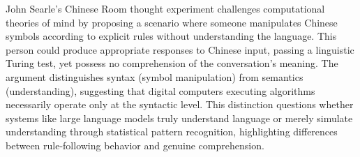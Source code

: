 John Searle's Chinese Room thought experiment challenges computational theories of mind by proposing a scenario where someone manipulates Chinese symbols according to explicit rules without understanding the language. This person could produce appropriate responses to Chinese input, passing a linguistic Turing test, yet possess no comprehension of the conversation's meaning. The argument distinguishes syntax (symbol manipulation) from semantics (understanding), suggesting that digital computers executing algorithms necessarily operate only at the syntactic level. This distinction questions whether systems like large language models truly understand language or merely simulate understanding through statistical pattern recognition, highlighting differences between rule-following behavior and genuine comprehension.
